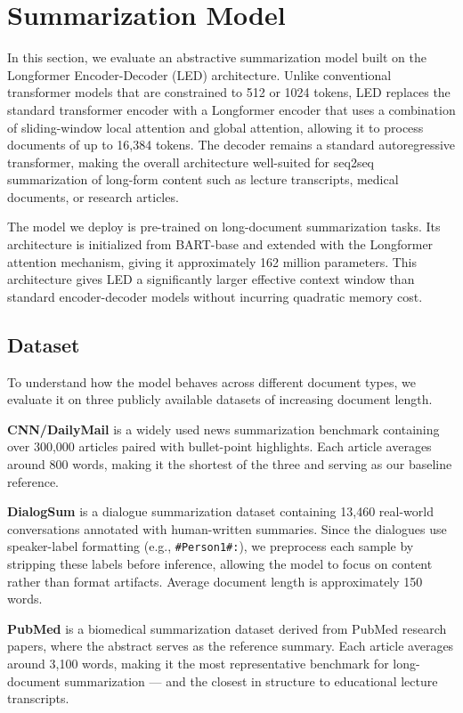 \section{Summarization Model}

In this section, we evaluate an abstractive summarization model built on the Longformer Encoder-Decoder (LED) architecture. Unlike conventional transformer models that are constrained to 512 or 1024 tokens, LED replaces the standard transformer encoder with a Longformer encoder that uses a combination of sliding-window local attention and global attention, allowing it to process documents of up to 16,384 tokens. The decoder remains a standard autoregressive transformer, making the overall architecture well-suited for seq2seq summarization of long-form content such as lecture transcripts, medical documents, or research articles.

The model we deploy is pre-trained on long-document summarization tasks. Its architecture is initialized from BART-base and extended with the Longformer attention mechanism, giving it approximately 162 million parameters. This architecture gives LED a significantly larger effective context window than standard encoder-decoder models without incurring quadratic memory cost.

\subsection{Dataset}

To understand how the model behaves across different document types, we evaluate it on three publicly available datasets of increasing document length.

\textbf{CNN/DailyMail} is a widely used news summarization benchmark containing over 300,000 articles paired with bullet-point highlights. Each article averages around 800 words, making it the shortest of the three and serving as our baseline reference.

\textbf{DialogSum} is a dialogue summarization dataset containing 13,460 real-world conversations annotated with human-written summaries. Since the dialogues use speaker-label formatting (e.g., \texttt{\#Person1\#:}), we preprocess each sample by stripping these labels before inference, allowing the model to focus on content rather than format artifacts. Average document length is approximately 150 words.

\textbf{PubMed} is a biomedical summarization dataset derived from PubMed research papers, where the abstract serves as the reference summary. Each article averages around 3,100 words, making it the most representative benchmark for long-document summarization — and the closest in structure to educational lecture transcripts.

